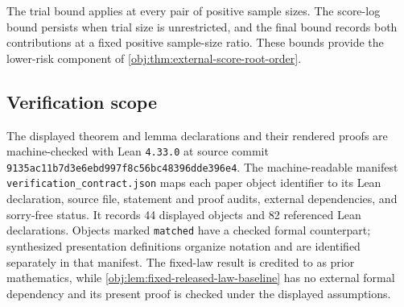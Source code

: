 The trial bound applies at every pair of positive sample sizes. The score-log bound persists when trial size is unrestricted, and the final bound records both contributions at a fixed positive sample-size ratio. These bounds provide the lower-risk component of \cref{obj:thm:external-score-root-order}.

\subsection{Verification scope}

The displayed theorem and lemma declarations and their rendered proofs are machine-checked with Lean \texttt{4.33.0} at source commit \texttt{9135ac11b7d3e6ebd997f8c56bc48396dde396e4}. The machine-readable manifest \texttt{verification\_contract.json} maps each paper object identifier to its Lean declaration, source file, statement and proof audits, external dependencies, and sorry-free status. It records 44 displayed objects and 82 referenced Lean declarations. Objects marked \texttt{matched} have a checked formal counterpart; synthesized presentation definitions organize notation and are identified separately in that manifest. The fixed-law result is credited to \citet[Theorem 3.2 and eq. (3.1)]{FanShermanShum2014} as prior mathematics, while \cref{obj:lem:fixed-released-law-baseline} has no external formal dependency and its present proof is checked under the displayed assumptions.

